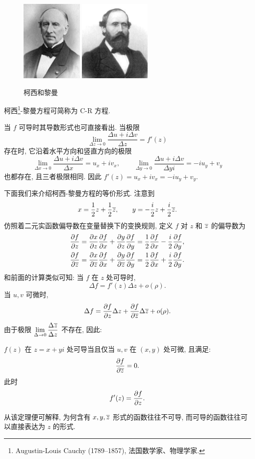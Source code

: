 \begin{figure}[!h]
  \centering
  \includegraphics[height=40mm]{../image/Cauchy.jpeg}
  \hspace{5em}
  \includegraphics[height=40mm]{../image/Riemann.jpeg}
  \caption{柯西和黎曼}
\end{figure}

柯西\footnote{%
  Augustin-Louis Cauchy (1789--1857), 法国数学家、物理学家.
}-黎曼方程可简称为 C-R 方程.

当 $f$ 可导时其导数形式也可直接看出.
当极限
\[
  \lim\limits_{\Delta z\to 0}\dfrac{\Delta u+i\Delta v}{\Delta z}=f'(z)
\]
存在时, 它沿着水平方向和竖直方向的极限
\[
  \lim\limits_{\Delta x\to 0}\dfrac{\Delta u+i\Delta v}{\Delta x}=u_x+iv_x,\qquad
  \lim\limits_{\Delta y\to 0}\dfrac{\Delta u+i\Delta v}{\Delta y i}=-iu_y+v_y
\]
也都存在, 且三者极限相同.
因此 $f'(z)=u_x+iv_x=-iu_y+v_y$.

下面我们来介绍柯西-黎曼方程的等价形式.
注意到
\[
  x=\dfrac12z+\dfrac12\overline z,\qquad
  y=-\dfrac i2z+\dfrac i2\overline z.
\]
仿照着二元实函数偏导数在变量替换下的变换规则, 定义 $f$ 对 $z$ 和 $\overline z$ 的偏导数为
  \[\begin{aligned}
      \dfrac{\partial f}{\partial z}&
    =\dfrac{\partial x}{\partial z}\dfrac{\partial f}{\partial x}+\dfrac{\partial y}{\partial z}\dfrac{\partial f}{\partial y}
    =\frac12\dfrac{\partial f}{\partial x}-\frac i2\dfrac{\partial f}{\partial y},\\
      \dfrac{\partial f}{\partial \overline z}&
    =\dfrac{\partial x}{\partial \overline z}\dfrac{\partial f}{\partial x}+\dfrac{\partial y}{\partial \overline z}\dfrac{\partial f}{\partial y}
    =\frac12\dfrac{\partial f}{\partial x}+\frac i2\dfrac{\partial f}{\partial y}.
  \end{aligned}\]
和前面的计算类似可知: 当 $f$ 在 $z$ 处可导时,
\[
  \Delta f=f'(z)\Delta z+o(\rho).
\]
当 $u,v$ 可微时,
\[
  \Delta f=\dfrac{\partial f}{\partial z}\Delta z+\dfrac{\partial f}{\partial \overline z}\Delta\overline z+o(\rho).
\]
由于极限 $\lim\limits_{\Delta\to 0}\dfrac{\Delta \overline z}{\Delta z}$ 不存在, 因此:
\begin{theorem}[柯西-黎曼定理的等价形式]
  $f(z)$ 在 $z=x+yi$ 处可导当且仅当 $u,v$ 在 $(x,y)$ 处可微, 且满足:
    \[\dfrac{\partial f}{\partial \overline z}=0.\]
  此时
    \[f'(z)=\dfrac{\partial f}{\partial z}.\]
\end{theorem}
从该定理便可解释, 为何含有 $x,y,\overline z$ 形式的函数往往不可导, 而可导的函数往往可以直接表达为 $z$ 的形式.

